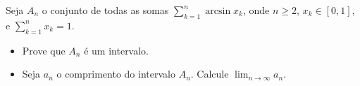 Seja \(A_n\) o conjunto de todas as somas \(\sum_{k=1}^n \arcsin x_k\), onde \(n \geq 2\), \(x_k \in [0,1]\), e \(\sum_{k=1}^n x_k = 1\).
\begin{itemize}
\item[(a)] Prove que \(A_n\) é um intervalo.
\item[(b)] Seja \(a_n\) o comprimento do intervalo \(A_n\). Calcule \(\lim_{n \to \infty} a_n\).
\end{itemize}
